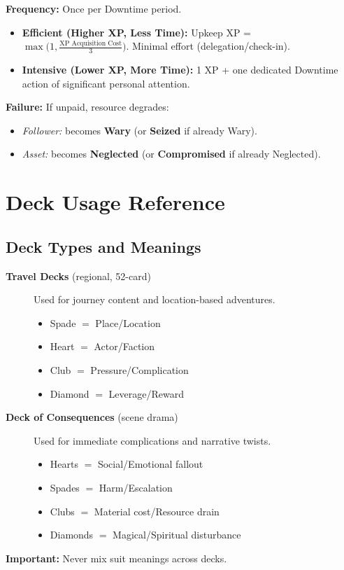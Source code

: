 \textbf{Frequency:} Once per Downtime period.

\begin{itemize}
    \item \textbf{Efficient (Higher XP, Less Time):} Upkeep XP = \(\max\bigl(1, \frac{\text{XP Acquisition Cost}}{3}\bigr)\). Minimal effort (delegation/check-in).
    \item \textbf{Intensive (Lower XP, More Time):} 1 XP + one dedicated Downtime action of significant personal attention.
\end{itemize}

\textbf{Failure:} If unpaid, resource degrades:
\begin{itemize}
    \item \emph{Follower:} becomes \textbf{Wary} (or \textbf{Seized} if already Wary).
    \item \emph{Asset:} becomes \textbf{Neglected} (or \textbf{Compromised} if already Neglected).
\end{itemize}

\newpage
\section{Deck Usage Reference}\label{sec:deck_reference}

\subsection{Deck Types and Meanings}\label{subsec:deck_types}
\begin{description}
    \item[\textbf{Travel Decks} (regional, 52-card)] Used for journey content and location-based adventures.
        \begin{itemize}
            \item Spade $=$ Place/Location
            \item Heart $=$ Actor/Faction
            \item Club $=$ Pressure/Complication
            \item Diamond $=$ Leverage/Reward
        \end{itemize}
    \item[\textbf{Deck of Consequences} (scene drama)] Used for immediate complications and narrative twists.
        \begin{itemize}
            \item Hearts $=$ Social/Emotional fallout
            \item Spades $=$ Harm/Escalation
            \item Clubs $=$ Material cost/Resource drain
            \item Diamonds $=$ Magical/Spiritual disturbance
        \end{itemize}
\end{description}
\textbf{Important:} Never mix suit meanings across decks.

